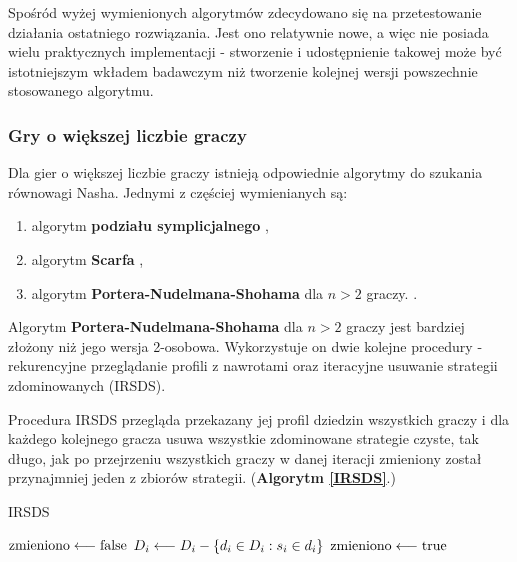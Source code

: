 \documentclass[polish]{standalone}
\begin{document}
Spośród wyżej wymienionych algorytmów zdecydowano się na przetestowanie działania ostatniego rozwiązania. Jest ono
relatywnie nowe, a więc nie posiada wielu praktycznych implementacji - stworzenie i udostępnienie takowej może być
istotniejszym wkładem badawczym niż tworzenie kolejnej wersji powszechnie stosowanego algorytmu.

\subsubsection{Gry o większej liczbie graczy}

Dla gier o większej liczbie graczy istnieją odpowiednie algorytmy do szukania równowagi Nasha. Jednymi z częściej
wymienianych są:
\begin{enumerate}
\item algorytm \textbf{podziału symplicjalnego}  \cite{LTH-NE},
\item algorytm \textbf{Scarfa}  \cite{SCARF-NR},
\item algorytm \textbf{Portera-Nudelmana-Shohama} dla $n > 2$ graczy. \cite{PNS-NE}.
\end{enumerate}


Algorytm \textbf{Portera-Nudelmana-Shohama} dla $n > 2$ graczy jest bardziej złożony niż jego wersja 2-osobowa.
Wykorzystuje on dwie kolejne procedury - rekurencyjne przeglądanie profili z nawrotami
oraz iteracyjne usuwanie strategii zdominowanych (IRSDS).

Procedura IRSDS przegląda przekazany jej profil dziedzin wszystkich graczy i dla każdego kolejnego gracza usuwa
wszystkie zdominowane strategie czyste, tak długo, jak po przejrzeniu wszystkich graczy w danej iteracji zmieniony 
został przynajmniej jeden z zbiorów strategii. (\textbf{Algorytm \ref{IRSDS}}.)

\begin{algorithm}
\caption{IRSDS}
\label{IRSDS}
\begin{algorithmic}
\REPEAT
 \STATE $\textrm{zmieniono} \longleftarrow \textrm{false}$
     \STATE $D_i \longleftarrow D_i - \{ d_i \in D_i: s_i \in d_i \}$
     \STATE $\textrm{zmieniono} \longleftarrow \textrm{true}$
     \ENDIF
    \ENDIF
   \ENDFOR 
  \ENDFOR
 \ENDFOR
{}
\end{algorithmic}
\end{algorithm}
\end{document}

